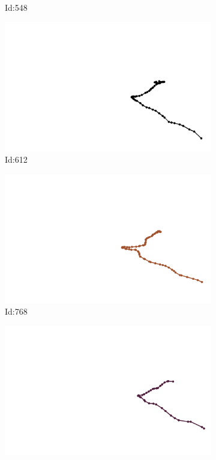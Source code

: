 \documentclass[12pt,twoside]{report}
\begin{document}
\begin{figure}
\begin{subfigure}[b]{0.20\textwidth}
\caption{Id:548}
\end{subfigure}
\begin{subfigure}[b]{0.20\textwidth}
\centering
\includegraphics[width=\textwidth]{../../trajectories/612.png}
\caption{Id:612}
\end{subfigure}
\begin{subfigure}[b]{0.20\textwidth}
\centering
\includegraphics[width=\textwidth]{../../trajectories/768.png}
\caption{Id:768}
\end{subfigure}
\begin{subfigure}[b]{0.20\textwidth}
\centering
\includegraphics[width=\textwidth]{../../trajectories/795.png}

\end{subfigure}
\end{figure}
\end{document}
